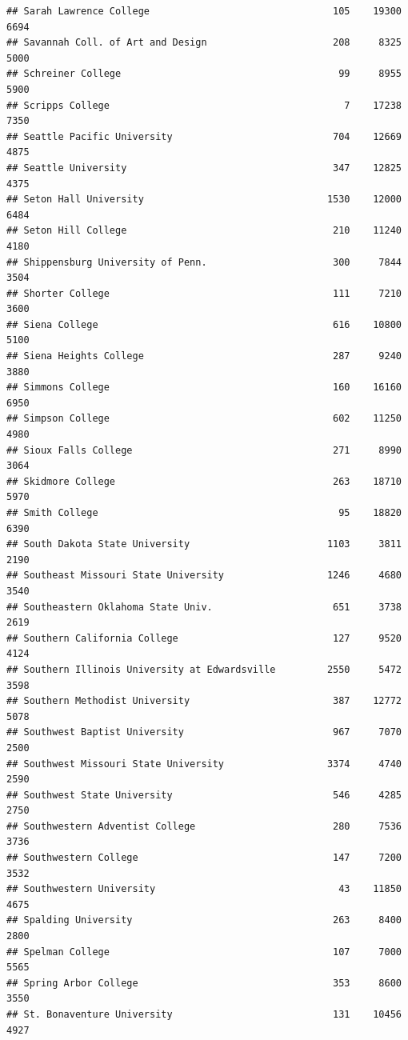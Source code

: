 \documentclass[
]{article}
\begin{document}
\begin{verbatim}
## Sarah Lawrence College                                105    19300       6694
## Savannah Coll. of Art and Design                      208     8325       5000
## Schreiner College                                      99     8955       5900
## Scripps College                                         7    17238       7350
## Seattle Pacific University                            704    12669       4875
## Seattle University                                    347    12825       4375
## Seton Hall University                                1530    12000       6484
## Seton Hill College                                    210    11240       4180
## Shippensburg University of Penn.                      300     7844       3504
## Shorter College                                       111     7210       3600
## Siena College                                         616    10800       5100
## Siena Heights College                                 287     9240       3880
## Simmons College                                       160    16160       6950
## Simpson College                                       602    11250       4980
## Sioux Falls College                                   271     8990       3064
## Skidmore College                                      263    18710       5970
## Smith College                                          95    18820       6390
## South Dakota State University                        1103     3811       2190
## Southeast Missouri State University                  1246     4680       3540
## Southeastern Oklahoma State Univ.                     651     3738       2619
## Southern California College                           127     9520       4124
## Southern Illinois University at Edwardsville         2550     5472       3598
## Southern Methodist University                         387    12772       5078
## Southwest Baptist University                          967     7070       2500
## Southwest Missouri State University                  3374     4740       2590
## Southwest State University                            546     4285       2750
## Southwestern Adventist College                        280     7536       3736
## Southwestern College                                  147     7200       3532
## Southwestern University                                43    11850       4675
## Spalding University                                   263     8400       2800
## Spelman College                                       107     7000       5565
## Spring Arbor College                                  353     8600       3550
## St. Bonaventure University                            131    10456       4927

\end{verbatim}
\end{document}

